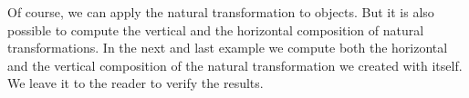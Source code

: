 

Of course, we can apply the natural transformation to objects. But it is also possible to compute the vertical and the horizontal composition of natural transformations.
In the next and last example we compute both the horizontal and the vertical composition of the natural transformation we created with itself. We leave it to the
reader to verify the results.

\begin{small}

\end{small}
